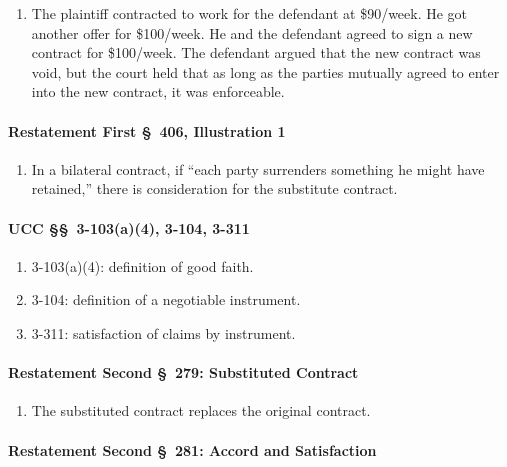 \begin{enumerate}
    \item The plaintiff contracted to work for the defendant at \$90/week. He 
    got another offer for \$100/week. He and the defendant agreed to sign a 
    new contract for \$100/week. The defendant argued that the new contract 
    was void, but the court held that as long as the parties mutually agreed 
    to enter into the new contract, it was enforceable.
\end{enumerate}

\paragraph{Restatement First \S\ 406, Illustration 1}

\begin{enumerate}
    \item In a bilateral contract, if ``each party surrenders something he 
    might have retained,'' there is consideration for the substitute contract.
\end{enumerate}

\paragraph{UCC \S\S\ 3-103(a)(4), 3-104, 3-311}

\begin{enumerate}
    \item 3-103(a)(4): definition of good faith.
    \item 3-104: definition of a negotiable instrument.
    \item 3-311: satisfaction of claims by instrument.
\end{enumerate}

\paragraph{Restatement Second \S\ 279: Substituted Contract}

\begin{enumerate}
    \item The substituted contract replaces the original contract.
\end{enumerate}

\paragraph{Restatement Second \S\ 281: Accord and Satisfaction}

